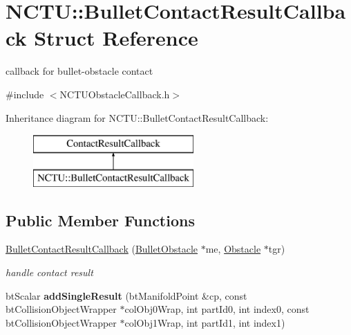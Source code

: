 \hypertarget{struct_n_c_t_u_1_1_bullet_contact_result_callback}{}\section{N\+C\+TU\+:\+:Bullet\+Contact\+Result\+Callback Struct Reference}
\label{struct_n_c_t_u_1_1_bullet_contact_result_callback}


callback for bullet-\/obstacle contact  




{\ttfamily \#include $<$N\+C\+T\+U\+Obstacle\+Callback.\+h$>$}

Inheritance diagram for N\+C\+TU\+:\+:Bullet\+Contact\+Result\+Callback\+:\begin{figure}[H]
\begin{center}
\leavevmode
\includegraphics[height=2.000000cm]{struct_n_c_t_u_1_1_bullet_contact_result_callback}
\end{center}
\end{figure}
\subsection*{Public Member Functions}
\begin{DoxyCompactItemize}
\item 
\hyperlink{struct_n_c_t_u_1_1_bullet_contact_result_callback_a97ca928726763f91f76e675fd4df48d3}{Bullet\+Contact\+Result\+Callback} (\hyperlink{class_n_c_t_u_1_1_bullet_obstacle}{Bullet\+Obstacle} $\ast$me, \hyperlink{class_n_c_t_u_1_1_obstacle}{Obstacle} $\ast$tgr)\hypertarget{struct_n_c_t_u_1_1_bullet_contact_result_callback_a97ca928726763f91f76e675fd4df48d3}{}\label{struct_n_c_t_u_1_1_bullet_contact_result_callback_a97ca928726763f91f76e675fd4df48d3}

\begin{DoxyCompactList}\small\item\em handle contact result \end{DoxyCompactList}\item 
bt\+Scalar {\bfseries add\+Single\+Result} (bt\+Manifold\+Point \&cp, const bt\+Collision\+Object\+Wrapper $\ast$col\+Obj0\+Wrap, int part\+Id0, int index0, const bt\+Collision\+Object\+Wrapper $\ast$col\+Obj1\+Wrap, int part\+Id1, int index1)\hypertarget{struct_n_c_t_u_1_1_bullet_contact_result_callback_a7d692fc1c76a971ae37b65d1d711f349}{}\label{struct_n_c_t_u_1_1_bullet_contact_result_callback_a7d692fc1c76a971ae37b65d1d711f349}

\end{DoxyCompactItemize}
